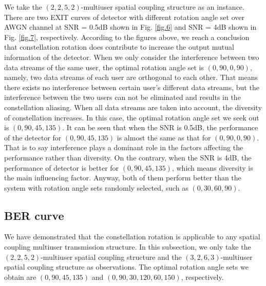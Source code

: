\documentclass[conference]{IEEEtran}
\begin{document}
We take the $(2,2,5,2)$-multiuser spatial coupling structure as an instance. There are two EXIT curves of detector with different rotation angle set over AWGN channel at SNR = 0.5dB shown in Fig. \ref{fig.6} and SNR = 4dB shown in Fig. \ref{fig.7}, respectively. According to the figures above, we reach a conclusion that constellation rotation does contribute to increase the output mutual information of the detector. When we only consider the interference between two data streams of the same user, the optimal rotation angle set is $(0,90,0,90)$, namely, two data streams of each user are orthogonal to each other. That means there exists no interference between certain user's different data streams, but the interference between the two users can not be eliminated and results in the constellation aliasing. When all data streams are taken into account, the diversity of constellation increases. In this case, the optimal rotation angle set we seek out is $(0,90,45,135)$. It can be seen that when the SNR is 0.5dB, the performance of the detector for $(0,90,45,135)$ is almost the same as that for $(0,90,0,90)$. That is to say interference plays a dominant role in the factors affecting the performance rather than diversity. On the contrary, when the SNR is 4dB, the performance of detector is better for $(0,90,45,135)$, which means diversity is the main influencing factor. Anyway, both of them perform better than the system with rotation angle sets randomly selected, such as $(0,30,60,90)$.
\subsection{BER curve}
We have demonstrated that the constellation rotation is applicable to any spatial coupling multiuser transmission structure. In this subsection, we only take the $(2,2,5,2)$-multiuser spatial coupling structure and the $(3,2,6,3)$-multiuser spatial coupling structure as observations. The optimal rotation angle sets we obtain are $(0,90,45,135)$ and $(0,90,30,120,60,150)$, respectively.
\end{document}
